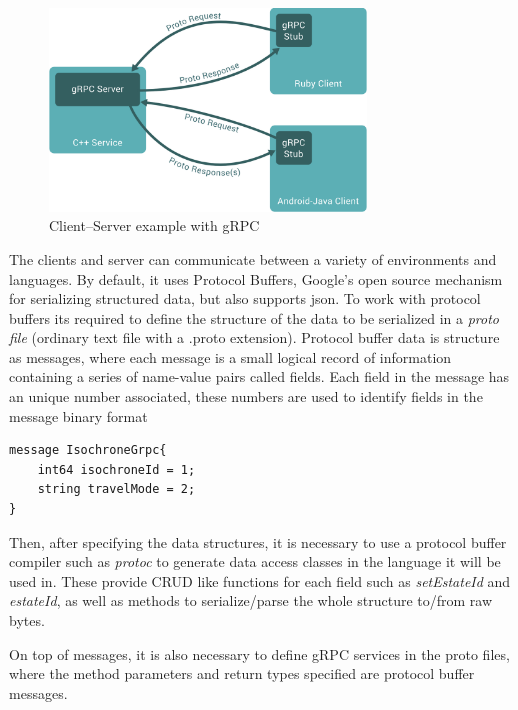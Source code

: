 \begin{figure}[h]
    \centering
    \includegraphics[width=0.75\textwidth,clip,trim=0 0 0 0]{Chapters/img/backend/gRPC.png}
    \caption{Client--Server example with gRPC~\cite{grpc-architecture-example}} 
    \label{fig:gprc-architecture-example}
\end{figure}

The clients and server can communicate between a variety of environments and languages. By default, it uses Protocol Buffers, Google's open source mechanism for serializing structured data, but also supports \acrshort{json}. To work with protocol buffers its required to define the structure of the data to be serialized in a \textit{proto file} (ordinary text file with a .proto extension). Protocol buffer data is structure as messages, where each message is a small logical record of information containing a series of name-value pairs called fields. Each field in the message has an unique number associated, these numbers are used to identify fields in the message binary format

\begin{lstlisting}
message IsochroneGrpc{
    int64 isochroneId = 1;
    string travelMode = 2;
}
\end{lstlisting}



Then, after specifying the data structures, it is necessary to use a protocol buffer compiler such as \textit{protoc} to generate data access classes in the language it will be used in. These provide CRUD like functions for each field such as \textit{setEstateId} and \textit{estateId}, as well as methods to serialize/parse the whole structure to/from raw bytes.

On top of messages, it is also necessary to define gRPC services in the proto files, where the method parameters and return types specified are protocol buffer messages.

